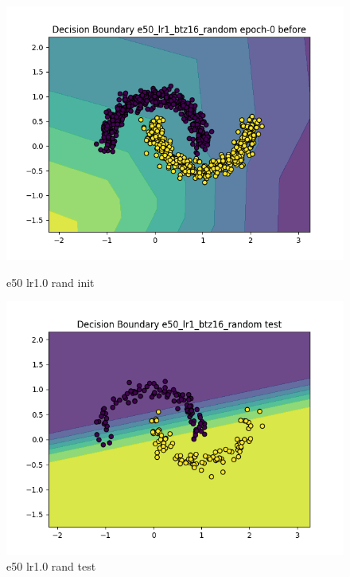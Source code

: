 \documentclass[8pt]{article}
\begin{document}
\begin{figure}[H]
    \begin{minipage}{0.32\textwidth}
        \centering
        \includegraphics[width=\textwidth]{../Prob4/out/1024_173617/e50_lr1_btz16_random/decision_boundary_epoch-0 before.png}
        \caption{e50 lr1.0 rand init}
        \label{fig:e50 lr1.0 rand init}
    \end{minipage}
    \begin{minipage}{0.32\textwidth}
        \centering
        \includegraphics[width=\textwidth]{../Prob4/out/1024_173617/e50_lr1_btz16_random/decision_boundary_test.png}
        \caption{e50 lr1.0 rand test}
        \label{fig:e50 lr1.0 rand test}
    \end{minipage}

\end{figure}
\end{document}
